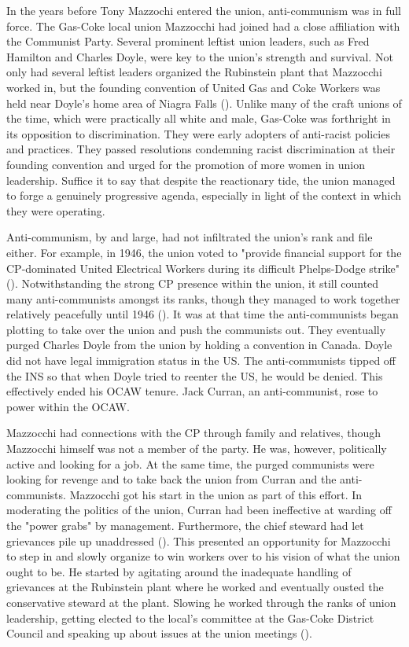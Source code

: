 \documentclass[12pt]{article}
\begin{document}
In the years before Tony Mazzochi entered the union, anti-communism was in full force. The Gas-Coke local union Mazzocchi had joined had a close affiliation with the Communist Party. Several prominent leftist union leaders, such as Fred Hamilton and Charles Doyle, were key to the union’s strength and survival. Not only had several leftist leaders organized the Rubinstein plant that Mazzocchi worked in, but the founding convention of United Gas and Coke Workers was held near Doyle’s home area of Niagra Falls (\cite[81]{leopoldManWhoHated2007}). Unlike many of the craft unions of the time, which were practically all white and male, Gas-Coke was forthright in its opposition to discrimination. They were early adopters of anti-racist policies and practices. They passed resolutions condemning racist discrimination at their founding convention and urged for the promotion of more women in union leadership. Suffice it to say that despite the reactionary tide, the union managed to forge a genuinely progressive agenda, especially in light of the context in which they were operating.

Anti-communism, by and large, had not infiltrated the union’s rank and file either. For example, in 1946, the union voted to "provide financial support for the CP-dominated United Electrical Workers during its difficult Phelps-Dodge strike" (\cite[84]{leopoldManWhoHated2007}). Notwithstanding the strong CP presence within the union, it still counted many anti-communists amongst its ranks, though they managed to work together relatively peacefully until 1946 (\cite[84]{leopoldManWhoHated2007}). It was at that time the anti-communists began plotting to take over the union and push the communists out. They eventually purged Charles Doyle from the union by holding a convention in Canada. Doyle did not have legal immigration status in the US. The anti-communists tipped off the INS so that when Doyle tried to reenter the US, he would be denied. This effectively ended his OCAW tenure. Jack Curran, an anti-communist, rose to power within the OCAW.

Mazzocchi had connections with the CP through family and relatives, though Mazzocchi himself was not a member of the party. He was, however, politically active and looking for a job. At the same time, the purged communists were looking for revenge and to take back the union from Curran and the anti-communists. Mazzocchi got his start in the union as part of this effort. In moderating the politics of the union, Curran had been ineffective at warding off the "power grabs" by management. Furthermore, the chief steward had let grievances pile up unaddressed (\cite[90]{leopoldManWhoHated2007}). This presented an opportunity for Mazzocchi to step in and slowly organize to win workers over to his vision of what the union ought to be. He started by agitating around the inadequate handling of grievances at the Rubinstein plant where he worked and eventually ousted the conservative steward at the plant. Slowing he worked through the ranks of union leadership, getting elected to the local’s committee at the Gas-Coke District Council and speaking up about issues at the union meetings (\cite[97--98]{leopoldManWhoHated2007}). 
\end{document}

